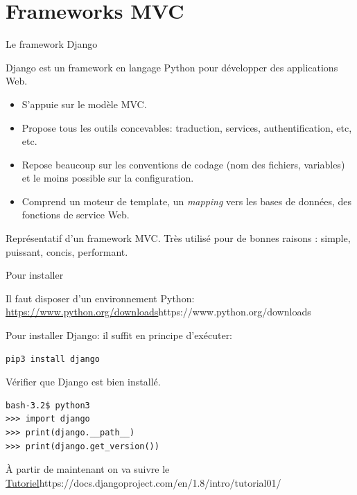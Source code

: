 

\section{Frameworks MVC}


\begin{frame}{Le framework Django}

Django est un framework en langage Python pour développer
des applications Web.

\begin{itemize}
   \item S'appuie sur le modèle MVC.
    \item Propose tous les outils concevables: traduction, services, authentification,
        etc, etc.
    \item Repose beaucoup sur les \alert{conventions} de codage (nom des fichiers,
       variables) et le moins possible sur la \alert{configuration}.   
    \item Comprend un moteur de template, un \textit{mapping} vers les bases
        de données, des fonctions de service Web.  
\end{itemize}  

Représentatif d'un framework MVC. Très utilisé pour de bonnes raisons : simple,
puissant, concis, performant.
\end{frame}


\begin{frame}[fragile]{Pour installer}

Il faut disposer d'un environnement Python: \url{https://www.python.org/downloads}{https://www.python.org/downloads}

\vfill

Pour installer Django: il suffit en principe d'exécuter:

\begin{verbatim}
pip3 install django
\end{verbatim}

\vfill

Vérifier que Django est bien installé.

\begin{verbatim}
bash-3.2$ python3
>>> import django
>>> print(django.__path__)
>>> print(django.get_version())
\end{verbatim}

\vfill

À partir de maintenant on va suivre le 
\url{Tutoriel}{https://docs.djangoproject.com/en/1.8/intro/tutorial01/}

\end{frame}


